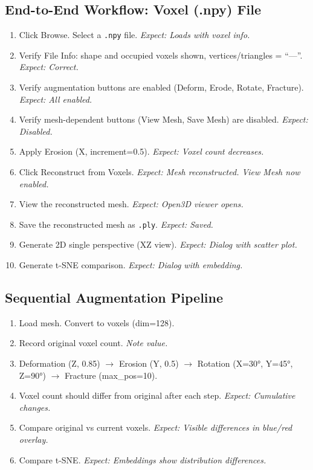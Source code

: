 \documentclass[12pt,a4paper]{article}
\begin{document}
\subsection{End-to-End Workflow: Voxel (.npy) File}
\begin{enumerate}[leftmargin=1.5em]
  \item Click Browse. Select a \texttt{.npy} file. \hfill\textit{Expect: Loads with voxel info.}
  \item Verify File Info: shape and occupied voxels shown, vertices/triangles = ``---''. \hfill\textit{Expect: Correct.}
  \item Verify augmentation buttons are enabled (Deform, Erode, Rotate, Fracture). \hfill\textit{Expect: All enabled.}
  \item Verify mesh-dependent buttons (View Mesh, Save Mesh) are disabled. \hfill\textit{Expect: Disabled.}
  \item Apply Erosion (X, increment=0.5). \hfill\textit{Expect: Voxel count decreases.}
  \item Click Reconstruct from Voxels. \hfill\textit{Expect: Mesh reconstructed. View Mesh now enabled.}
  \item View the reconstructed mesh. \hfill\textit{Expect: Open3D viewer opens.}
  \item Save the reconstructed mesh as \texttt{.ply}. \hfill\textit{Expect: Saved.}
  \item Generate 2D single perspective (XZ view). \hfill\textit{Expect: Dialog with scatter plot.}
  \item Generate t-SNE comparison. \hfill\textit{Expect: Dialog with embedding.}
\end{enumerate}

\subsection{Sequential Augmentation Pipeline}
\begin{enumerate}[leftmargin=1.5em]
  \item Load mesh. Convert to voxels (dim=128).
  \item Record original voxel count. \hfill\textit{Note value.}
  \item Deformation (Z, 0.85) $\rightarrow$ Erosion (Y, 0.5) $\rightarrow$ Rotation (X=30°, Y=45°, Z=90°) $\rightarrow$ Fracture (max\_pos=10).
  \item Voxel count should differ from original after each step. \hfill\textit{Expect: Cumulative changes.}
  \item Compare original vs current voxels. \hfill\textit{Expect: Visible differences in blue/red overlay.}
  \item Compare t-SNE. \hfill\textit{Expect: Embeddings show distribution differences.}
\end{enumerate}
\end{document}
